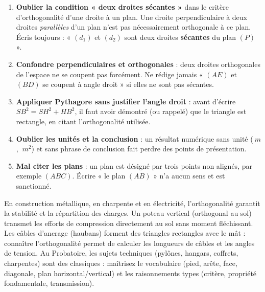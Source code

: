 \documentclass[11pt]{article}
\begin{document}
\begin{attention}
\begin{enumerate}
\item \textbf{Oublier la condition « deux droites sécantes »} dans le critère d'orthogonalité d'une droite à un plan. Une droite perpendiculaire à deux droites \emph{parallèles} d'un plan n'est pas nécessairement orthogonale à ce plan. Écris toujours : « $(d_1)$ et $(d_2)$ sont deux droites \textbf{sécantes} du plan $(P)$ ».
\item \textbf{Confondre perpendiculaires et orthogonales} : deux droites orthogonales de l'espace ne se coupent pas forcément. Ne rédige jamais « $(AE)$ et $(BD)$ se coupent à angle droit » si elles ne sont pas sécantes.
\item \textbf{Appliquer Pythagore sans justifier l'angle droit} : avant d'écrire $SB^2 = SH^2 + HB^2$, il faut avoir démontré (ou rappelé) que le triangle est rectangle, en citant l'orthogonalité utilisée.
\item \textbf{Oublier les unités et la conclusion} : un résultat numérique sans unité ($\SI{}{m}$, $\SI{}{m^2}$) et sans phrase de conclusion fait perdre des points de présentation.
\item \textbf{Mal citer les plans} : un plan est désigné par trois points non alignés, par exemple $(ABC)$. Écrire « le plan $(AB)$ » n'a aucun sens et est sanctionné.
\end{enumerate}
\end{attention}

\begin{savaistu}
En construction métallique, en charpente et en électricité, l'orthogonalité garantit la stabilité et la répartition des charges. Un poteau vertical (orthogonal au sol) transmet les efforts de compression directement au sol sans moment fléchissant. Les câbles d'ancrage (haubans) forment des triangles rectangles avec le mât : connaître l'orthogonalité permet de calculer les longueurs de câbles et les angles de tension. Au Probatoire, les sujets techniques (pylônes, hangars, coffrets, charpentes) sont des classiques : maîtrisez le vocabulaire (pied, arête, face, diagonale, plan horizontal/vertical) et les raisonnements types (critère, propriété fondamentale, transmission).
\end{savaistu}
\end{document}
